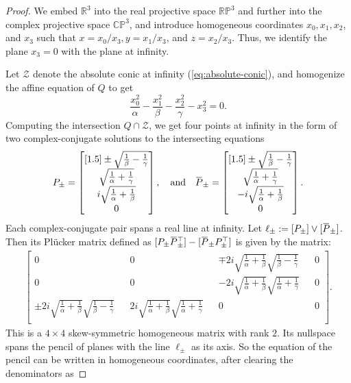 \documentclass[10pt, a4paper]{article}
\newcommand{\overbar}[1]{\mkern 1.5mu\overline{\mkern-1.5mu#1\mkern-1.5mu}\mkern 1.5mu}
\theoremstyle{BoldTopSpacing}
\theoremstyle{BoldTopSpacing}
\theoremstyle{BoldTopSpacing}
\theoremstyle{BoldTopBottomSpacing}
\theoremstyle{BoldTopSpacing}
\theoremstyle{BoldTopBottomSpacing}
\theoremstyle{remark}
\begin{document}
\begin{proof}
    We embed $\mathbb{R}^3$ into the real projective space $\mathbb{R}\mathbb{P}^3$ and further into the complex projective space $\mathbb{C}\mathbb{P}^3$, and introduce homogeneous coordinates $x_{0}, x_{1}, x_{2}$, and $x_{3}$ such that $x = x_{0} / x_{3}, y = x_{1} / x_{3}$, and $z = x_{2} / x_{3}$. Thus, we identify the plane $x_{3} = 0$ with the plane at infinity. \par
Let $\mathcal{Z}$ denote the absolute conic at infinity (\ref{eq:absolute-conic}), and homogenize the affine equation of $Q$ to get
\[
    \frac{x_{0}^2}{\alpha} - \frac{x_{1}^2}{\beta} - \frac{x_{2}^2}{\gamma} - x_{3}^2 = 0.
\]
Computing the intersection $Q \cap \mathcal{Z}$, we get four points at infinity in the form of two complex-conjugate solutions to the intersecting equations
\[
P_{\pm} =
\begin{bmatrix}[1.5]
\pm \sqrt{\frac{1}{\beta} - \frac{1}{\gamma}}\\
\sqrt{\frac{1}{\alpha} + \frac{1}{\gamma}}\\
i\sqrt{\frac{1}{\alpha} + \frac{1}{\beta}}\\
0
\end{bmatrix},
\quad \text{and} \quad
\overbar{P}_{\pm} =
\begin{bmatrix}[1.5]
\pm \sqrt{\frac{1}{\beta} - \frac{1}{\gamma}}\\
\sqrt{\frac{1}{\alpha} + \frac{1}{\gamma}}\\
-i\sqrt{\frac{1}{\alpha} + \frac{1}{\beta}}\\
0
\end{bmatrix}.
\]
Each complex-conjugate pair spans a real line at infinity. Let $\ell_{\pm} := [P_{\pm}] \vee [\overbar{P}_{\pm}]$. Then its Plücker matrix defined as $[P_{\pm} \overbar{P}_{\pm}^{\top}] - [\overbar{P}_{\pm} P_{\pm}^{\top}]$ is given by the matrix:
\begin{align*}
\begin{bmatrix}
0 && 0 && \mp 2 i \sqrt{\frac{1}{\alpha} + \frac{1}{\beta}} \sqrt{\frac{1}{\beta} - \frac{1}{\gamma}} && 0\\
0 && 0 && -2 i \sqrt{\frac{1}{\alpha} + \frac{1}{\beta}} \sqrt{\frac{1}{\alpha} + \frac{1}{\gamma}} && 0\\
\pm 2 i \sqrt{\frac{1}{\alpha} + \frac{1}{\beta}} \sqrt{\frac{1}{\beta} - \frac{1}{\gamma}} && 2 i \sqrt{\frac{1}{\alpha} + \frac{1}{\beta}}\sqrt{ \frac{1}{\alpha} + \frac{1}{\gamma}} && 0 && 0\\
\end{bmatrix}.
\end{align*}
This is a $4 \times 4$ skew-symmetric homogeneous matrix with rank $2$. Its nullspace spans the pencil of planes with the line $\ell_{\pm}$ as its axis. So the equation of the pencil can be written in homogeneous coordinates, after clearing the denominators as


\end{proof}
\end{document}
